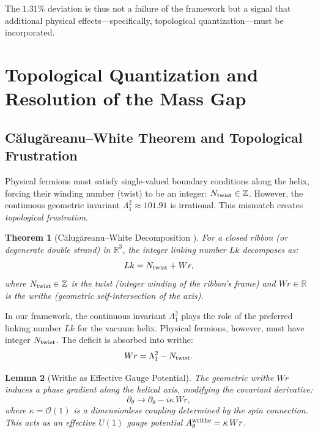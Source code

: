 \documentclass[12pt, a4paper]{article}
\newtheorem{theorem}{Theorem}[section]
\newtheorem{lemma}[theorem]{Lemma}
\theoremstyle{definition}
\newcommand{\cO}{\mathcal{O}}
\newcommand{\bbR}{\mathbb{R}}
\newcommand{\bbZ}{\mathbb{Z}}
\newcommand{\Tw}{N_{\rm twist}}
\begin{document}
The $1.31\%$ deviation is thus not a failure of the framework but a signal that additional physical effects---specifically, topological quantization---must be incorporated.

\section{Topological Quantization and Resolution of the Mass Gap}
\label{sec:topology}

\subsection{C\u{a}lug\u{a}reanu--White Theorem and Topological Frustration}
Physical fermions must satisfy single-valued boundary conditions along the helix, forcing their winding number (twist) to be an integer: $\Tw \in \bbZ$. However, the continuous geometric invariant $\Lambda_1^2 \approx 101.91$ is irrational. This mismatch creates \textit{topological frustration}.

\begin{theorem}[C\u{a}lug\u{a}reanu--White Decomposition \cite{calugareanu,white}]
For a closed ribbon (or degenerate double strand) in $\bbR^3$, the integer linking number $Lk$ decomposes as:
\begin{equation}
Lk = \Tw + Wr,
\label{eq:calugareanu-white}
\end{equation}
where $\Tw \in \bbZ$ is the twist (integer winding of the ribbon's frame) and $Wr \in \bbR$ is the writhe (geometric self-intersection of the axis).
\end{theorem}

In our framework, the continuous invariant $\Lambda_1^2$ plays the role of the preferred linking number $Lk$ for the vacuum helix. Physical fermions, however, must have integer $\Tw$. The deficit is absorbed into writhe:
\begin{equation}
Wr = \Lambda_1^2 - \Tw.
\label{eq:writhe-deficit}
\end{equation}

\begin{lemma}[Writhe as Effective Gauge Potential]
The geometric writhe $Wr$ induces a phase gradient along the helical axis, modifying the covariant derivative:
\begin{equation}
\partial_\theta \to \partial_\theta - i \kappa \, Wr,
\end{equation}
where $\kappa = \cO(1)$ is a dimensionless coupling determined by the spin connection. This acts as an effective $U(1)$ gauge potential $A_\theta^{\rm writhe} = \kappa \, Wr$.
\end{lemma}
\end{document}
